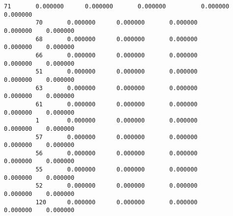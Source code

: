 \documentclass[11pt]{article}
\begin{document}
\begin{Verbatim}[commandchars=\\\{\}]
         71       0.000000      0.000000       0.000000          0.000000    0.000000   
         70       0.000000      0.000000       0.000000          0.000000    0.000000   
         68       0.000000      0.000000       0.000000          0.000000    0.000000   
         66       0.000000      0.000000       0.000000          0.000000    0.000000   
         51       0.000000      0.000000       0.000000          0.000000    0.000000   
         63       0.000000      0.000000       0.000000          0.000000    0.000000   
         61       0.000000      0.000000       0.000000          0.000000    0.000000   
         1        0.000000      0.000000       0.000000          0.000000    0.000000   
         57       0.000000      0.000000       0.000000          0.000000    0.000000   
         56       0.000000      0.000000       0.000000          0.000000    0.000000   
         55       0.000000      0.000000       0.000000          0.000000    0.000000   
         52       0.000000      0.000000       0.000000          0.000000    0.000000   
         120      0.000000      0.000000       0.000000          0.000000    0.000000   
         

\end{Verbatim}
\end{document}

